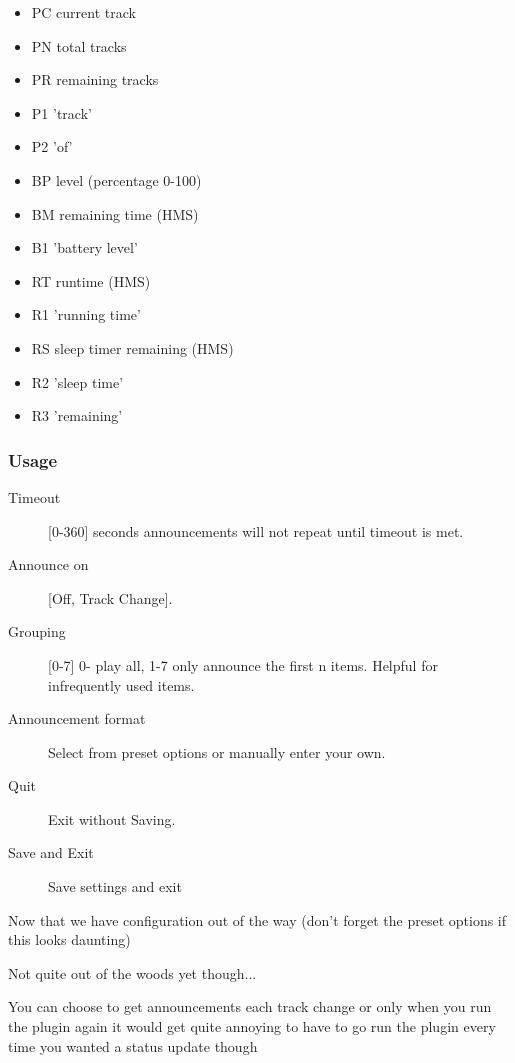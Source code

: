 \begin{itemize}
\item PC current track
\item PN total tracks
\item PR remaining tracks
\item P1 'track'
\item P2 'of'
\end{itemize}

\begin{itemize}
\item BP level (percentage 0-100)
\item BM remaining time (HMS)
\item B1 'battery level'
\end{itemize}

\begin{itemize}
\item RT runtime (HMS)
\item R1 'running time'
\item RS sleep timer remaining (HMS)
\item R2 'sleep time'
\item R3 'remaining'
\end{itemize}

\subsubsection{Usage}
\begin{description}
\item[Timeout] [0-360] seconds announcements will not repeat until timeout is met. 
\item[Announce on] [Off, Track Change].
\item[Grouping] [0-7] 0- play all, 1-7 only announce the first n items.
                Helpful for infrequently used items.
\item[Announcement format] Select from preset options or manually enter your own.
\item[Quit] Exit without Saving.
\item[Save and Exit] Save settings and exit
\end{description}

Now that we have configuration out of the way (don't forget the preset options if this looks daunting)

Not quite out of the woods yet though...

You can choose to get announcements each track change or only when you run the plugin again
it would get quite annoying to have to go run the plugin every time you wanted a status update though


